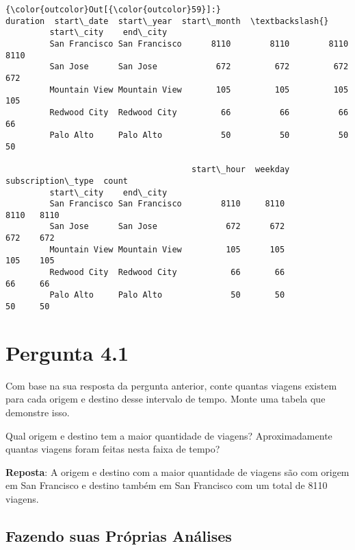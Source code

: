 \documentclass[11pt]{article}
\begin{document}
\begin{Verbatim}[commandchars=\\\{\}]
{\color{outcolor}Out[{\color{outcolor}59}]:}                              duration  start\_date  start\_year  start\_month  \textbackslash{}
         start\_city    end\_city                                                       
         San Francisco San Francisco      8110        8110        8110         8110   
         San Jose      San Jose            672         672         672          672   
         Mountain View Mountain View       105         105         105          105   
         Redwood City  Redwood City         66          66          66           66   
         Palo Alto     Palo Alto            50          50          50           50   
         
                                      start\_hour  weekday  subscription\_type  count  
         start\_city    end\_city                                                      
         San Francisco San Francisco        8110     8110               8110   8110  
         San Jose      San Jose              672      672                672    672  
         Mountain View Mountain View         105      105                105    105  
         Redwood City  Redwood City           66       66                 66     66  
         Palo Alto     Palo Alto              50       50                 50     50  
\end{Verbatim}
            
    \section{Pergunta 4.1}\label{pergunta-4.1}

Com base na sua resposta da pergunta anterior, conte quantas viagens
existem para cada origem e destino desse intervalo de tempo. Monte uma
tabela que demonstre isso.

Qual origem e destino tem a maior quantidade de viagens? Aproximadamente
quantas viagens foram feitas nesta faixa de tempo?

\textbf{Reposta}: A origem e destino com a maior quantidade de viagens
são com origem em San Francisco e destino também em San Francisco com um
total de 8110 viagens.

    \subsection{Fazendo suas Próprias
Análises}\label{fazendo-suas-pruxf3prias-anuxe1lises}
\end{document}
